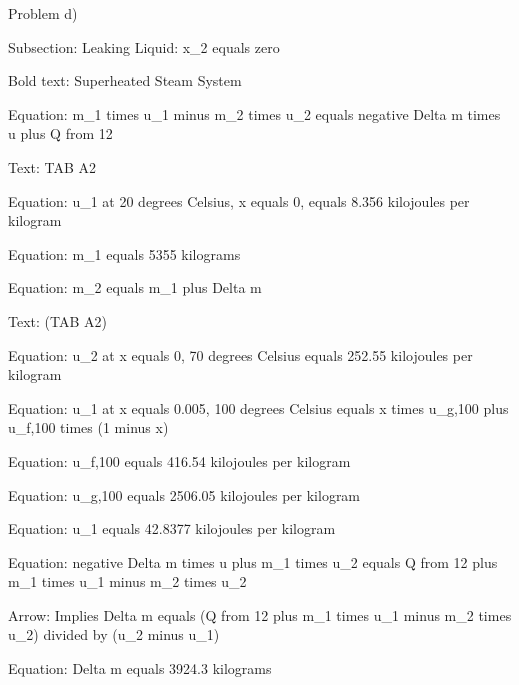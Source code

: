Problem d)

Subsection: Leaking Liquid: x_2 equals zero

Bold text: Superheated Steam System

Equation: m_1 times u_1 minus m_2 times u_2 equals negative Delta m times u plus Q from 12

Text: TAB A2

Equation: u_1 at 20 degrees Celsius, x equals 0, equals 8.356 kilojoules per kilogram

Equation: m_1 equals 5355 kilograms

Equation: m_2 equals m_1 plus Delta m

Text: (TAB A2)

Equation: u_2 at x equals 0, 70 degrees Celsius equals 252.55 kilojoules per kilogram

Equation: u_1 at x equals 0.005, 100 degrees Celsius equals x times u_g,100 plus u_f,100 times (1 minus x)

Equation: u_f,100 equals 416.54 kilojoules per kilogram

Equation: u_g,100 equals 2506.05 kilojoules per kilogram

Equation: u_1 equals 42.8377 kilojoules per kilogram

Equation: negative Delta m times u plus m_1 times u_2 equals Q from 12 plus m_1 times u_1 minus m_2 times u_2

Arrow: Implies Delta m equals (Q from 12 plus m_1 times u_1 minus m_2 times u_2) divided by (u_2 minus u_1)

Equation: Delta m equals 3924.3 kilograms